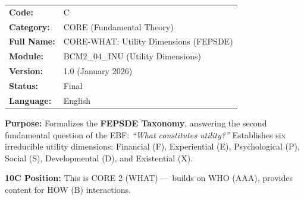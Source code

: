 %
%
%


\begin{tcolorbox}[colback=gray!5!white, colframe=gray!75!black,
    title=Appendix Header: C CORE-WHAT]

\begin{tabular}{@{}ll@{}}
\textbf{Code:} & C \\
\textbf{Category:} & CORE (Fundamental Theory) \\
\textbf{Full Name:} & CORE-WHAT: Utility Dimensions (FEPSDE) \\
\textbf{Module:} & BCM2\_04\_INU (Utility Dimensions) \\
\textbf{Version:} & 1.0 (January 2026) \\
\textbf{Status:} & Final \\
\textbf{Language:} & English \\
\end{tabular}

\vspace{0.5em}
\textbf{Purpose:} Formalizes the \textbf{FEPSDE Taxonomy}, answering the
second fundamental question of the EBF: \textit{``What constitutes utility?''}
Establishes six irreducible utility dimensions: Financial (F), Experiential (E),
Psychological (P), Social (S), Developmental (D), and Existential (X).

\textbf{10C Position:} This is CORE 2 (WHAT) --- builds on WHO (AAA),
provides content for HOW (B) interactions.

\end{tcolorbox}


